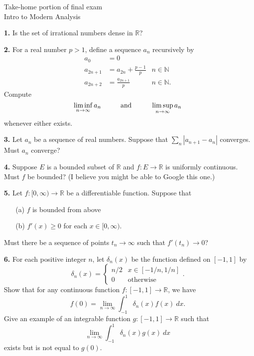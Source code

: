 \documentclass[12pt]{article}
\begin{document}
\noindent Take-home portion of final exam \\ Intro to Modern Analysis

\medskip

\noindent \textbf{1.} Is the set of irrational numbers dense in $\mathbb{R}$?

\medskip

\noindent \textbf{2.} For a real number $p > 1$, define a sequence $a_n$ recursively by 
\begin{align*}
a_0 &= 0 \\
a_{2n+1} &= a_{2n} + \frac{p-1}{p} & n \in \mathbb{N}\;\\
a_{2n+2} &= \frac{a_{2n+1}}{p} & n \in \mathbb{N}.
\end{align*}
Compute 
\[
\liminf_{n \to \infty}a_n \hspace{10mm} \text{and} \hspace{10mm} \limsup_{n \to \infty} a_n
\]
whenever either exists. 

\medskip

\noindent \textbf{3.}  Let $a_n$ be a sequence of real numbers. Suppose that $\sum_n |a_{n+1} - a_n|$ converges. Must $a_n$ converge?

\medskip

\noindent \textbf{4.} Suppose $E$ is a bounded subset of $\mathbb{R}$ and $f : E \to \mathbb{R}$ is uniformly continuous. Must $f$ be bounded? (I believe you might be able to Google this one.)

\medskip


\noindent \textbf{5.} Let $f : [0, \infty) \to \mathbb{R}$ be a differentiable function. Suppose that 
\begin{enumerate}
\item[(a)] $f$ is bounded from above
\item[(b)] $f'(x) \geqslant 0$ for each $x \in [0,\infty)$.
\end{enumerate}
Must there be a sequence of points $t_n \to \infty$ such that $f'(t_n) \to 0$?

\medskip

\noindent \textbf{6.} For each positive integer $n$, let $\delta_n(x)$ be the function defined on $[-1,1]$ by 
\[
\delta_n(x) = \begin{cases}
n/2 & x \in [-1/n, 1/n] \\
0 & \text{otherwise}
\end{cases}.
\]
Show that for any continuous function $f : [-1,1] \to \mathbb{R}$, we have 
\[
f(0) = \lim_{n \to \infty} \int_{-1}^1 \delta_n(x)f(x) \: dx.
\]
Give an example of an integrable function $g : [-1,1] \to \mathbb{R}$ such that 
\[
\lim_{n \to \infty} \int_{-1}^1 \delta_n(x) g(x) \: dx
\]
exists but is not equal to $g(0)$. 
\end{document}

